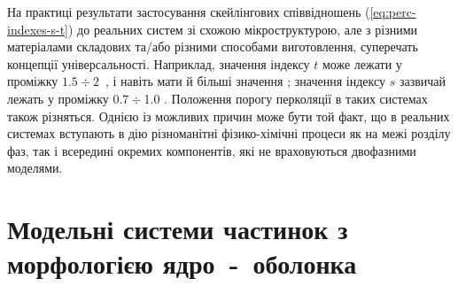 \documentclass[14pt,twoside]{vakthesis}
\begin{document}
На практиці результати застосування  скейлінгових співвідношень (\ref{eq:perc-indexes-s-t}) до реальних систем зі схожою мікроструктурою, але з різними матеріалами складових та/або різними способами виготовлення, суперечать концепції універсальності. Наприклад, значення індексу $t$ може лежати у проміжку $1.5\div 2$~\cite{Nan1993}, і навіть мати й більші значення \cite{Balberg1987,Nan1993}; значення індексу $s$ зазвичай лежать у проміжку $0.7 \div$1.0 \cite{Nan1993}.
Положення порогу перколяції в таких системах також різняться. 
Однією із можливих причин може бути той факт, що в реальних системах вступають в дію різноманітні фізико-хімічні процеси як на межі розділу фаз, так і всередині окремих компонентів, які не враховуються двофазними моделями. %


\section{Модельні системи частинок з морфологією ядро~-~оболонка}\label{sec:core-shell-intro}
\end{document}
